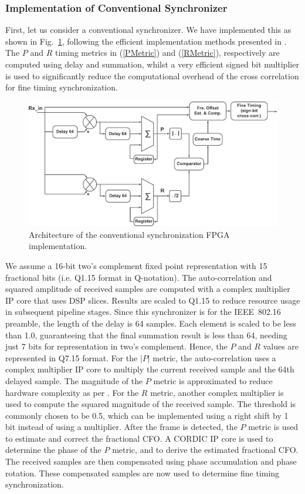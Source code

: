 		\subsubsection{Implementation of Conventional Synchronizer}

First, let us consider a conventional synchronizer. We have implemented this as shown in Fig.~\ref{fig:Con-Sync}, following the efficient implementation methods presented in \cite{Manavi2004,Wang2004,Guffey2007,Liu2009}.
The $P$ and $R$ timing metrics in (\ref{PMetric}) and (\ref{RMetric}), respectively are computed using delay and summation, whilst a very efficient signed bit multiplier \cite{Schwoerer2002} is used to significantly reduce the computational overhead of the cross correlation for fine timing synchronization.

\begin{figure}[h]
	\centerline{\includegraphics [width=1\columnwidth] {figures/Con_Sync.pdf}}
	\caption{Architecture of the conventional synchronization FPGA implementation.}
	\label{fig:Con-Sync}
\end{figure}

We assume a 16-bit two's complement fixed point representation with 15 fractional bits (i.e. Q1.15 format in Q-notation).
The auto-correlation and squared amplitude of received samples are computed with a complex multiplier IP core that uses DSP slices.
Results are scaled to Q1.15 to reduce resource usage in subsequent pipeline stages.
Since this synchronizer is for the IEEE~802.16 preamble, the length of the delay is 64 samples.
Each element is scaled to be less than 1.0, guaranteeing that the final summation result is less than 64, needing just 7 bits for representation in two's complement.
Hence, the $P$ and $R$ values are represented in Q7.15 format.
For the $|P|$ metric, the auto-correlation uses a complex multiplier IP core to multiply the current received sample and the 64th delayed sample.
The magnitude of the $P$ metric is approximated to reduce hardware complexity as per \cite{Liu2009}.
For the $R$ metric, another complex multiplier is used to compute the squared magnitude of the received sample.
The threshold is commonly chosen to be 0.5, which can be implemented using a right shift by 1 bit \cite{Kim2008} instead of using a multiplier.
After the frame is detected, the $P$ metric is used to estimate and correct the fractional CFO.
A CORDIC IP core is used to determine the phase of the $P$ metric, and to derive the estimated fractional CFO.
The received samples are then compensated using phase accumulation and phase rotation.
These compensated samples are now used to determine fine timing synchronization.

